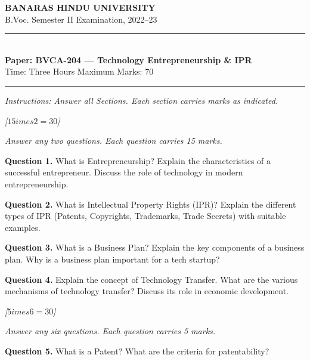 \documentclass[11pt,a4paper]{article}
\newcommand{\pts}[1]{\hfill   \textit{[#1]}}
\begin{document}
\begin{center}
  {\large\bfseries BANARAS HINDU UNIVERSITY}\\[2pt]
  {\normalsize B.Voc. Semester II Examination, 2022--23}\\[6pt]
  \rule{0.8\linewidth}{0.5pt}\\[6pt]
  {\large\bfseries Paper: BVCA-204 --- Technology Entrepreneurship \& IPR}\\[4pt]
  {\normalsize Time: Three Hours \hfill Maximum Marks: 70}
\end{center}
\rule{\linewidth}{0.4pt}
\smallskip



\noindent   \textit{Instructions: Answer all Sections. Each section carries marks as indicated.}
\bigskip



\pts{$15 imes2=30$}
\medskip


\noindent   \textit{Answer any two questions. Each question carries 15 marks.}
\bigskip



\noindent   \textbf{Question 1.} What is Entrepreneurship? Explain the characteristics of a successful entrepreneur. Discuss the role of technology in modern entrepreneurship.
\bigskip



\noindent   \textbf{Question 2.} What is Intellectual Property Rights (IPR)? Explain the different types of IPR (Patents, Copyrights, Trademarks, Trade Secrets) with suitable examples.
\bigskip



\noindent   \textbf{Question 3.} What is a Business Plan? Explain the key components of a business plan. Why is a business plan important for a tech startup?
\bigskip



\noindent   \textbf{Question 4.} Explain the concept of Technology Transfer. What are the various mechanisms of technology transfer? Discuss its role in economic development.
\bigskip



\pts{$5 imes6=30$}
\medskip


\noindent   \textit{Answer any six questions. Each question carries 5 marks.}
\bigskip



\noindent   \textbf{Question 5.} What is a Patent? What are the criteria for patentability?
\medskip
\end{document}
